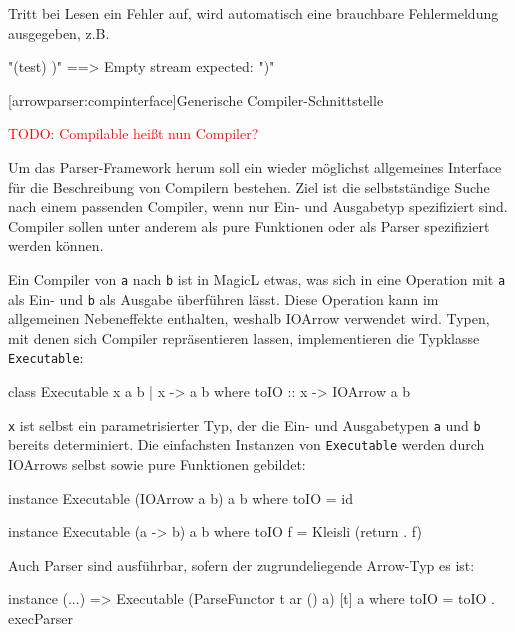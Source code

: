 \documentclass[11pt, a4paper, bibgerm]{book}
\newcommand\icode[1]{\lstinline?#1?}
\newcommand{\todo}[1]{
  \textcolor{red}{TODO: #1}
}
\newcommand\lsection{}
\begin{document}
Tritt bei Lesen ein Fehler auf, wird automatisch eine brauchbare Fehlermeldung
ausgegeben, z.B.

\begin{code}
"(test) )"  ==>  Empty stream expected: ")"
\end{code}

\lsection[arrowparser:compinterface]{Generische Compiler-Schnittstelle}

\todo{Compilable heißt nun Compiler?}

Um das Parser-Framework herum soll ein wieder möglichst allgemeines
Interface für die Beschreibung von Compilern bestehen. Ziel ist die
selbstständige Suche nach einem passenden Compiler, wenn nur Ein- und
Ausgabetyp spezifiziert sind. Compiler sollen unter anderem als pure
Funktionen oder als Parser spezifiziert werden können.

Ein Compiler von \icode{a} nach \icode{b} ist in MagicL etwas, was sich
in eine Operation mit \icode{a} als Ein- und \icode{b} als Ausgabe
überführen lässt. Diese Operation kann im allgemeinen Nebeneffekte
enthalten, weshalb IOArrow verwendet wird. Typen, mit denen sich
Compiler repräsentieren lassen, implementieren die Typklasse
\icode{Executable}:
\begin{code}
class Executable x a b | x -> a b where
  toIO :: x -> IOArrow a b
\end{code}
\icode{x} ist selbst ein parametrisierter Typ, der die Ein- und
Ausgabetypen \icode{a} und \icode{b} bereits determiniert. Die einfachsten
Instanzen von \icode{Executable} werden durch IOArrows selbst sowie pure
Funktionen gebildet:
\begin{code}
instance Executable (IOArrow a b) a b where
  toIO = id

instance Executable (a -> b) a b where
  toIO f = Kleisli (return . f)
\end{code}
Auch Parser sind ausführbar, sofern der zugrundeliegende Arrow-Typ es
ist:
\begin{code}
instance (...) => Executable (ParseFunctor t ar () a) [t] a where
  toIO = toIO . execParser
\end{code}
\end{document}
